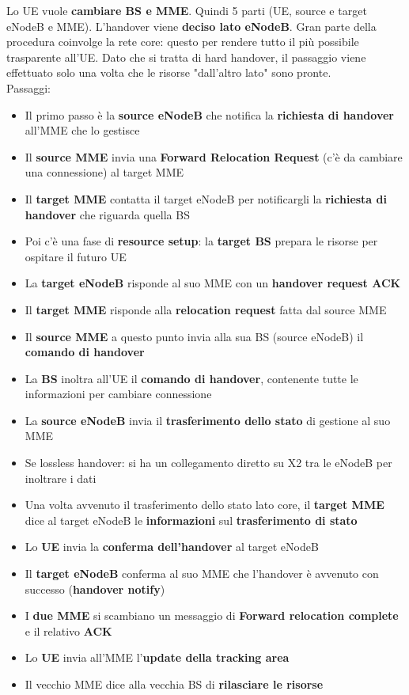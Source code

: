 Lo UE vuole \textbf{cambiare BS e MME}. Quindi 5 parti (UE, source e target eNodeB e MME). L'handover viene \textbf{deciso lato eNodeB}. Gran parte della procedura coinvolge la rete core: questo per rendere tutto il più possibile trasparente all'UE. Dato che si tratta di hard handover, il passaggio viene effettuato solo una volta che le risorse "dall'altro lato" sono pronte. \\

Passaggi: 
\begin{itemize}
	\item Il primo passo è la \textbf{source eNodeB} che notifica la \textbf{richiesta di handover} all'MME che lo gestisce
	\item Il \textbf{source MME} invia una \textbf{Forward Relocation Request} (c'è da cambiare una connessione) al target MME
	\item Il \textbf{target MME} contatta il target eNodeB per notificargli la \textbf{richiesta di handover} che riguarda quella BS
	\item Poi c'è una fase di \textbf{resource setup}: la \textbf{target BS} prepara le risorse per ospitare il futuro UE
	\item La \textbf{target eNodeB} risponde al suo MME con un \textbf{handover request ACK}
	\item Il \textbf{target MME} risponde alla \textbf{relocation request} fatta dal source MME
	\item Il \textbf{source MME} a questo punto invia alla sua BS (source eNodeB) il \textbf{comando di handover}
	\item La \textbf{BS} inoltra all'UE il \textbf{comando di handover}, contenente tutte le informazioni per cambiare connessione
	\item La \textbf{source eNodeB} invia il \textbf{trasferimento dello stato} di gestione al suo MME
	\item Se lossless handover: si ha un collegamento diretto su X2 tra le eNodeB per inoltrare i dati
	\item Una volta avvenuto il trasferimento dello stato lato core, il \textbf{target MME} dice al target eNodeB le \textbf{informazioni} sul \textbf{trasferimento di stato}
	\item Lo \textbf{UE} invia la \textbf{conferma dell'handover} al target eNodeB
	\item Il \textbf{target eNodeB} conferma al suo MME che l'handover è avvenuto con successo (\textbf{handover notify})
	\item I \textbf{due MME} si scambiano un messaggio di \textbf{Forward relocation complete} e il relativo \textbf{ACK}
	\item Lo \textbf{UE} invia all'MME l'\textbf{update della tracking area}
	\item Il vecchio MME dice alla vecchia BS di \textbf{rilasciare le risorse}
\end{itemize}

